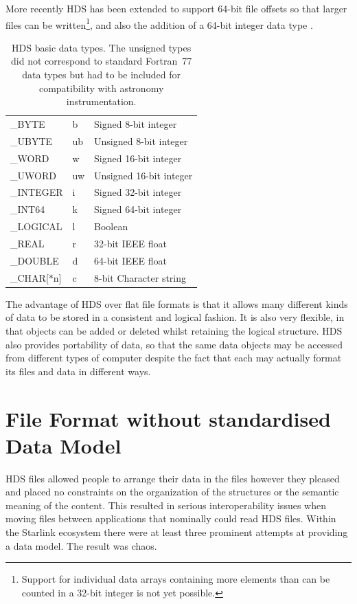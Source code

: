 \documentclass[final,authoryear,5p,times,twocolumn]{elsarticle}
\begin{document}
More recently HDS has been extended to support 64-bit file offsets so
that larger files can be written\footnote{Support for individual data
arrays containing more elements than can be counted in a 32-bit
integer is not yet possible.}, and also the
addition of a 64-bit integer data type \citep{P82_adassxxiii}.

\begin{table}
\caption{HDS basic data types. The unsigned types did not correspond
  to standard Fortran~77 data types but had to be included for
  compatibility with astronomy instrumentation.}
\label{tab:hdstypes}
\begin{center}
\begin{tabular}{lll}
\hline
\_BYTE & b & Signed 8-bit integer \\
\_UBYTE & ub & Unsigned 8-bit integer \\
\_WORD & w & Signed 16-bit integer \\
\_UWORD & uw & Unsigned 16-bit integer \\
\_INTEGER & i & Signed 32-bit integer \\
\_INT64 & k &Signed 64-bit integer \\
\_LOGICAL & l & Boolean \\
\_REAL & r & 32-bit IEEE float \\
\_DOUBLE & d & 64-bit IEEE float \\
\_CHAR[$*$n] & c & 8-bit Character string \\
\hline
\end{tabular}
\end{center}
\end{table}

The advantage of HDS over flat file formats is that it allows many different kinds of data to
be stored in a consistent and logical fashion. It is also very
flexible, in that objects can be added or deleted whilst retaining the
logical structure. HDS also provides portability of data, so that the
same data objects may be accessed from different types of computer
despite the fact that each may actually format its files and data in
different ways.

\section{File Format without standardised Data Model}
\label{sec:chaos}

HDS files allowed people to arrange their data in the files however
they pleased and placed no constraints on the organization of the
structures or the semantic meaning of the content. This resulted in
serious interoperability issues when moving files between applications
that nominally could read HDS files. Within the Starlink ecosystem
there were at least three prominent attempts at providing a data model.
The result was chaos.
\end{document}

